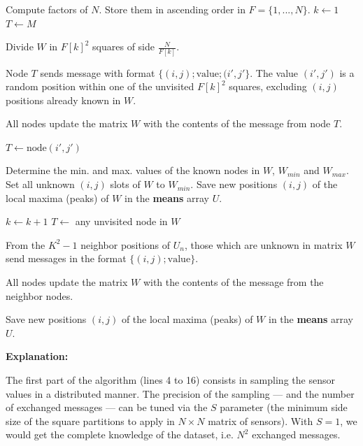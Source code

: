 \documentclass[paper=a4, fontsize=11pt]{scrartcl} %
\numberwithin{equation}{section} %
\numberwithin{figure}{section} %
\numberwithin{table}{section} %
\newcommand{\vertbreak}{\vspace{1.75 mm}}
\begin{document}
\begin{algorithmic}[1]

\State Compute factors of $N$. Store them in ascending order in $F = \{1, ..., N\}$.
\State $k \leftarrow 1$
\State $T \leftarrow M$


\State Divide $W$ in $F[k]^2$ squares of side $\frac{N}{F[k]}$.


\State Node $T$ sends message with format $\{(i,j); \text{value}; (i',j'\}$. 
        The value $(i',j')$ is a random position within one of the unvisited 
        $F[k]^2$ squares, excluding $(i,j)$ positions already known in $W$.

\State All nodes update the matrix $W$ with the contents of the message from 
        node $T$.

\State $T \leftarrow \text{node}(i',j')$

\EndFor

\State Determine the min. and max. values of the known nodes in $W$, 
        $W_{min}$ and $W_{max}$.
\State Set all unknown $(i,j)$ slots of $W$ to $W_{min}$.
\State Save new positions $(i,j)$ of the local maxima (peaks) of $W$ in the 
        \textbf{means} array $U$.

\State $k \leftarrow k + 1$
\State $T \leftarrow$ any unvisited node in $W$

\EndFor


\State From the $K^2 - 1$ neighbor positions of $U_n$, those which are unknown 
        in matrix $W$ send messages in the format $\{(i,j); \text{value}\}$.

\State All nodes update the matrix $W$ with the contents of the message from 
        the neighbor nodes.

\EndFor

\State Save new positions $(i,j)$ of the local maxima (peaks) of $W$ in the 
        \textbf{means} array $U$.

\end{algorithmic}\vertbreak

\textbf{Explanation:}\vertbreak

The first part of the algorithm (lines 4 to 16) consists in sampling the 
sensor values in a distributed manner. The precision of the sampling --- and the 
number of exchanged messages --- can be tuned via the $S$ parameter (the 
minimum side size of the square partitions to apply in $N \times N$ matrix of sensors).
With $S = 1$, we would get the complete knowledge of the dataset, i.e. $N^2$ 
exchanged messages.\vertbreak
\end{document}
